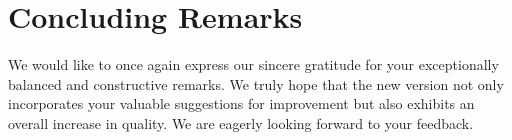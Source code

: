 \documentclass[a4paper, 12pt]{scrartcl}
\theoremstyle{break}
\begin{document}
\section*{Concluding Remarks}

We would like to once again express our sincere gratitude for your exceptionally balanced and constructive remarks. We truly hope that the new version not only incorporates your valuable suggestions for improvement but also exhibits an overall increase in quality. We are eagerly looking forward to your feedback.
\end{document}
